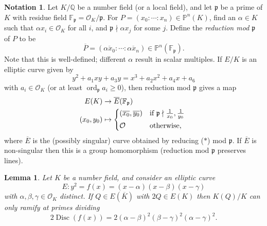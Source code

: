 \documentclass[a4paper]{article}
\theoremstyle{plain}
\newtheorem{lemma}[theorem]{Lemma}
\theoremstyle{remark}
\theoremstyle{definition}
\newtheorem*{notation}{Notation}
\DeclareMathOperator{\Disc}{Disc}
\DeclareMathOperator{\ord}{ord}
\newcommand{\p}{\mathfrak{p}}
\renewcommand{\P}{\mathbb{P}}
\renewcommand{\O}{\mathcal{O}}
\newcommand{\F}{\mathbb{F}}
\newcommand{\Q}{\mathbb{Q}}
\begin{document}
\begin{notation}
    Let $K/\Q$ be a number field (or a local field), and let $\p$ be a prime of
    $K$ with residue field $\F_\p=\O_K/\p$. For $P=(x_0:\cdots:x_n)\in\P^n(K)$,
    find an $\alpha\in K$ such that $\alpha x_i\in\O_K$ for all $i$, and
    $\p\nmid\alpha x_j$ for some $j$. Define the \emph{reduction mod $\p$} of
    $P$ to be
    \begin{equation*}
        \overline P = (\overline{\alpha x_0}:\cdots:\overline{\alpha x_n})
            \in\P^n(\F_\p).
    \end{equation*}
    Note that this is well-defined; different $\alpha$ result in scalar
    multiples. If $E/K$ is an elliptic curve given by
    \begin{equation*}
        y^2 + a_1xy + a_3y = x^3 + a_2x^2 + a_4x + a_6 \tag{$*$}
    \end{equation*}
    with $a_i\in\O_K$ (or at least $\ord_\p a_i\ge0$), then reduction mod $\p$
    gives a map
    \begin{align*}
        E(K) &\to \overline E(\F_\p) \\
        (x_0,y_0) &\mapsto \begin{dcases*}
            (\overline{x_0},\overline{y_0})
                & if $\p\nmid\frac{1}{x_0},\frac{1}{y_0}$ \\
            \O & otherwise,
        \end{dcases*}
    \end{align*}
    where $\overline E$ is the (possibly singular) curve obtained by reducing
    ($*$) mod $\p$. If $\overline E$ is non-singular then this is a group
    homomorphism (reduction mod $\p$ preserves lines).
\end{notation}

\begin{lemma}
    Let $K$ be a number field, and consider an elliptic curve
    \begin{equation*}
        E:y^2 = f(x) = (x-\alpha)(x-\beta)(x-\gamma)
    \end{equation*}
    with $\alpha,\beta,\gamma\in\O_K$ distinct. If $Q\in E(\overline K)$ with
    $2Q\in E(K)$ then $K(Q)/K$ can only ramify at primes dividing
    \begin{equation*}
        2\Disc(f(x)) = 2(\alpha-\beta)^2(\beta-\gamma)^2(\alpha-\gamma)^2.
    \end{equation*}
\end{lemma}
\end{document}
